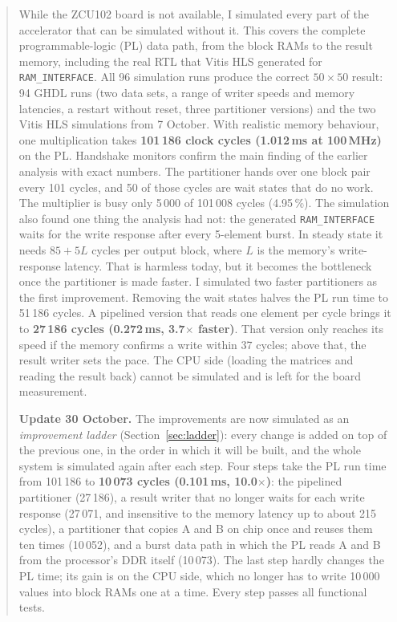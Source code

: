 \documentclass[11pt,a4paper]{article}
\newcommand{\code}[1]{\texttt{#1}}
\begin{document}
\begin{abstract}
\noindent
While the ZCU102 board is not available, I simulated every part of the accelerator that can be simulated without it. This covers the complete programmable-logic (PL) data path, from the block RAMs to the result memory, including the real RTL that Vitis HLS generated for \code{RAM\_INTERFACE}. All 96 simulation runs produce the correct $50\times50$ result: 94 GHDL runs (two data sets, a range of writer speeds and memory latencies, a restart without reset, three partitioner versions) and the two Vitis HLS simulations from 7 October. With realistic memory behaviour, one multiplication takes \textbf{101\,186 clock cycles (1.012\,ms at 100\,MHz)} on the PL. Handshake monitors confirm the main finding of the earlier analysis with exact numbers. The partitioner hands over one block pair every 101 cycles, and 50 of those cycles are wait states that do no work. The multiplier is busy only 5\,000 of 101\,008 cycles (4.95\,\%). The simulation also found one thing the analysis had not: the generated \code{RAM\_INTERFACE} waits for the write response after every 5-element burst. In steady state it needs $85 + 5L$ cycles per output block, where $L$ is the memory's write-response latency. That is harmless today, but it becomes the bottleneck once the partitioner is made faster. I simulated two faster partitioners as the first improvement. Removing the wait states halves the PL run time to 51\,186 cycles. A pipelined version that reads one element per cycle brings it to \textbf{27\,186 cycles (0.272\,ms, 3.7$\times$ faster)}. That version only reaches its speed if the memory confirms a write within 37 cycles; above that, the result writer sets the pace. The CPU side (loading the matrices and reading the result back) cannot be simulated and is left for the board measurement.

\smallskip\noindent\textbf{Update 30 October.} The improvements are now simulated as an \emph{improvement ladder} (Section~\ref{sec:ladder}): every change is added on top of the previous one, in the order in which it will be built, and the whole system is simulated again after each step. Four steps take the PL run time from 101\,186 to \textbf{10\,073 cycles (0.101\,ms, 10.0$\times$)}: the pipelined partitioner (27\,186), a result writer that no longer waits for each write response (27\,071, and insensitive to the memory latency up to about 215 cycles), a partitioner that copies A and B on chip once and reuses them ten times (10\,052), and a burst data path in which the PL reads A and B from the processor's DDR itself (10\,073). The last step hardly changes the PL time; its gain is on the CPU side, which no longer has to write 10\,000 values into block RAMs one at a time. Every step passes all functional tests.
\end{abstract}
\end{document}
